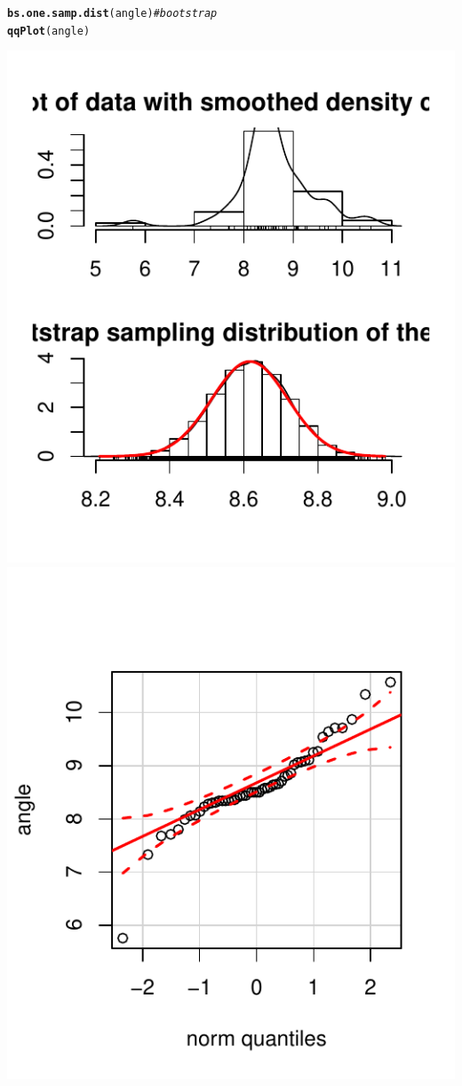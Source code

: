 \documentclass{article}\usepackage[]{graphicx}\usepackage[]{color}
\makeatletter
\def\maxwidth{ %
  \ifdim\Gin@nat@width>\linewidth
    \linewidth
  \else
    \Gin@nat@width
  \fi
}
\newcommand{\hlcom}[1]{\textcolor[rgb]{0.678,0.584,0.686}{\textit{#1}}}%
\newcommand{\hlstd}[1]{\textcolor[rgb]{0.345,0.345,0.345}{#1}}%
\newcommand{\hlkwd}[1]{\textcolor[rgb]{0.737,0.353,0.396}{\textbf{#1}}}%
\newenvironment{kframe}{%
 \def\at@end@of@kframe{}%
 \ifinner\ifhmode%
  \def\at@end@of@kframe{\end{minipage}}%
  \begin{minipage}{\columnwidth}%
 \fi\fi%
 \def\FrameCommand##1{\hskip\@totalleftmargin \hskip-\fboxsep
 \colorbox{shadecolor}{##1}\hskip-\fboxsep
     \hskip-\linewidth \hskip-\@totalleftmargin \hskip\columnwidth}%
 \MakeFramed {\advance\hsize-\width
   \@totalleftmargin\z@ \linewidth\hsize
   \@setminipage}}%
 {\par\unskip\endMakeFramed%
 \at@end@of@kframe}
\newenvironment{knitrout}{}{} %
\makeatother
\begin{document}
\begin{knitrout}
\color{fgcolor}\begin{kframe}
\begin{alltt}
\hlkwd{bs.one.samp.dist}\hlstd{(angle)} \hlcom{# bootstrap}
\hlkwd{qqPlot}\hlstd{(angle)}
\end{alltt}
\end{kframe}

{\centering \includegraphics[width=\maxwidth]{figure/1_a_boot-1} 
\includegraphics[width=\maxwidth]{figure/1_a_boot-2} 
}
\end{knitrout}
\end{document}
